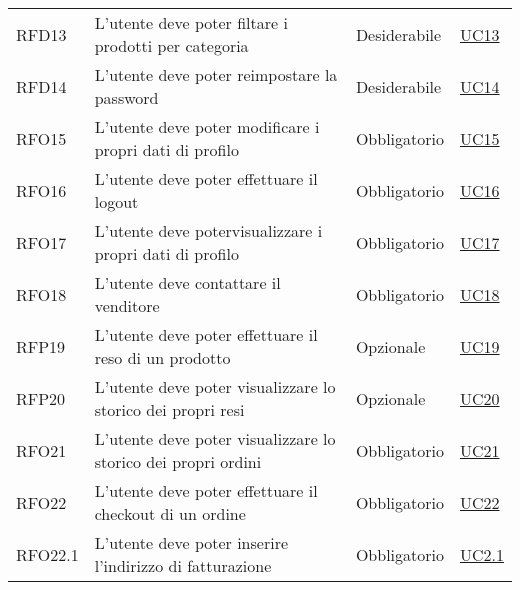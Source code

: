 \begin{center}
\begin{longtable}[!h]{p{50px} p{200px} p{100px} p{50px}}
        RFD13                                 & L'utente deve poter filtare i prodotti per categoria                                             & Desiderabile             & \hyperref[sec:UC13]{UC13}     \\
        RFD14                                 & L'utente deve poter reimpostare la password                                                      & Desiderabile             & \hyperref[sec:UC14]{UC14}     \\
        RFO15                                 & L'utente deve poter modificare i propri dati di profilo                                          & Obbligatorio             & \hyperref[sec:UC15]{UC15}     \\
        RFO16                                 & L'utente deve poter effettuare il logout                                                         & Obbligatorio             & \hyperref[sec:UC16]{UC16}     \\
        RFO17                                 & L'utente deve potervisualizzare i propri dati di profilo                                         & Obbligatorio             & \hyperref[sec:UC17]{UC17}     \\
        RFO18                                 & L'utente deve contattare il venditore                                                            & Obbligatorio             & \hyperref[sec:UC18]{UC18}     \\
        RFP19                                 & L'utente deve poter effettuare il reso di un prodotto                                            & Opzionale                & \hyperref[sec:UC19]{UC19}     \\
        RFP20                                 & L'utente deve poter visualizzare lo storico dei propri resi                                      & Opzionale                & \hyperref[sec:UC20]{UC20}     \\
        RFO21                                 & L'utente deve poter visualizzare lo storico dei propri ordini                                    & Obbligatorio             & \hyperref[sec:UC21]{UC21}     \\
        RFO22                                 & L'utente deve poter effettuare il checkout di un ordine                                          & Obbligatorio             & \hyperref[sec:UC22]{UC22}     \\
        RFO22.1                               & L'utente deve poter inserire l'indirizzo di fatturazione                                         & Obbligatorio             & \hyperref[sec:UC22]{UC2.1}    \\

\end{longtable}
\end{center}
